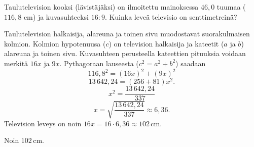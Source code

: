 
\begin{esimerkki}
Taulutelevision kooksi (lävistäjäksi) on ilmoitettu mainoksessa $46,0$ tuumaa ($116,8$ cm) ja kuvasuhteeksi $16:9$. Kuinka leveä televisio on senttimetreinä?


\begin{esimratk}

Taulutelevision halkaisija, alareuna ja toinen sivu muodostavat suorakulmaisen kolmion. Kolmion hypotenuusa ($c$) on television halkaisija ja kateetit ($a$ ja $b$) alareuna ja toinen sivu. Kuvasuhteen perusteella kateettien pituuksia voidaan merkitä $16x$ ja $9x$. Pythagoraan lauseesta ($c^2 = a^2 + b^2$) saadaan
\[
116,8^2 = (16x)^2 + (9x)^2
\]
\[
13\,642,24 = (256+81)x^2.
\]
\[
x^2 = \frac{13\,642,24}{337}
\]
\[
x= \sqrt{\frac{13\,642,24}{337}} \approx 6,36.
\]
Television leveys on noin $16x = 16\cdot 6,36\approx 102$\,cm.
\end{esimratk}

\begin{esimvast}Noin $102$\,cm. \end{esimvast}
\end{esimerkki}

